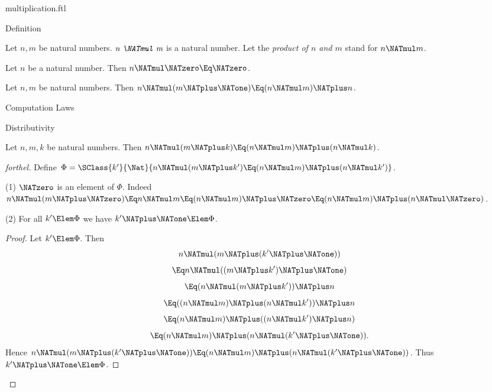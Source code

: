\documentclass{stex}
\begin{document}
\begin{smodule}{multiplication.ftl}

\begin{sfragment}{Definition}
  \begin{signature}[forthel]
    Let $n, m$ be natural numbers.
    $\emph{n \NATmul m}$ is a natural number.
    Let the \emph{product of $n$ and $m$} stand for $n \NATmul m$.
  \end{signature}

  \begin{axiom}[forthel]
    Let $n$ be a natural number.
    Then $n \NATmul \NATzero \Eq \NATzero$.
  \end{axiom}

  \begin{axiom}[forthel]
    Let $n, m$ be natural numbers.
    Then $n \NATmul (m \NATplus \NATone) \Eq (n \NATmul m) \NATplus n$.
  \end{axiom}
\end{sfragment}

\begin{sfragment}{Computation Laws}
  \begin{sfragment}{Distributivity}


    \begin{proposition}[forthel,name=left-distributivity of multiplication over addition]
      Let $n, m, k$ be natural numbers.
      Then $n \NATmul (m \NATplus k) \Eq (n \NATmul m) \NATplus (n \NATmul k)$.
    \end{proposition}
    \begin{proof}[forthel]
      Define $\Phi = \SClass{k'}{\Nat}{n \NATmul (m \NATplus k') \Eq (n \NATmul m) \NATplus (n \NATmul k')}$.

      (1) $\NATzero$ is an element of $\Phi$.
      Indeed $n \NATmul (m \NATplus \NATzero)
        \Eq n \NATmul m
        \Eq (n \NATmul m) \NATplus \NATzero
        \Eq (n \NATmul m) \NATplus (n \NATmul \NATzero)$.

      (2) For all $k' \Elem \Phi$ we have $k' \NATplus \NATone \Elem \Phi$. 
      \begin{proof}
        Let $k'\Elem \Phi$.
        Then
        \[  n \NATmul (m \NATplus (k' \NATplus \NATone))                  \]
        \[    \Eq n \NATmul ((m \NATplus k') \NATplus \NATone)              \]
        \[    \Eq (n \NATmul (m \NATplus k')) \NATplus n              \]
        \[    \Eq ((n \NATmul m) \NATplus (n \NATmul k')) \NATplus n    \]
        \[    \Eq (n \NATmul m) \NATplus ((n \NATmul k') \NATplus n)    \]
        \[    \Eq (n \NATmul m) \NATplus (n \NATmul (k' \NATplus \NATone)).   \]
        Hence $n \NATmul (m \NATplus (k' \NATplus \NATone)) \Eq (n \NATmul m) \NATplus (n \NATmul (k' \NATplus \NATone))$.
        Thus $k' \NATplus \NATone \Elem \Phi$.
      \end{proof}


\end{proof}
\end{sfragment}
\end{sfragment}
\end{smodule}
\end{document}
